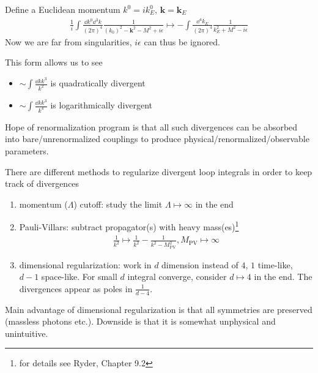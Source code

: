 Define a Euclidean momentum $k^0 = ik_E^0$, $\pmb{k} = \pmb{k}_E$
\begin{align*}
	\frac{1}{i}\int \frac{\dd k^0 \dd^3 k}{(2\pi)^4} \frac{1}{(k_0)^2 - \pmb{k}^2 - M^2 +i\epsilon} \longmapsto - \int \frac{\dd^4 k_E}{(2\pi)^4} \frac{1}{k^2_E + M^2 -i\epsilon}
\end{align*}
Now we are far from singularities, $i\epsilon$ can thus be ignored.

This form allows us to see
\begin{itemize}[label={}]
	\item 
{} 
$\sim \int \frac{\dd k k^3}{k^2}$ is quadratically divergent

\item
{}
$\sim \int \frac{\dd k k^3}{k^4}$ is logarithmically divergent
\end{itemize}

Hope of renormalization program is that all such divergences can be absorbed into bare/unrenormalized couplings to produce physical/renormalized/observable parameters.

There are different methods to regularize divergent loop integrals in order to keep track of divergences
\begin{enumerate}
	\item momentum ($\Lambda$) cutoff: study the limit $\Lambda \longmapsto \infty$ in the end
	\item Pauli-Villars: subtract propagator(s) with heavy mass(es)\footnote{for details see Ryder, Chapter 9.2}
		\begin{align*}
			\frac{1}{k^2} \longmapsto \frac{1}{k^2} - \frac{1}{k^2 - M^2_\text{PV}}, M_\text{PV} \longmapsto \infty
		\end{align*}
	\item dimensional regularization: work in $d$ dimension instead of $4$, $1$ time-like, $d-1$ space-like. For small $d$ integral converge, consider $d \longmapsto 4$ in the end. The divergences appear as poles in $\frac{1}{d-4}$.
\end{enumerate}
Main advantage of dimensional regularization is that all symmetries are preserved (massless photons etc.). Downside is that it is somewhat unphysical and unintuitive.

